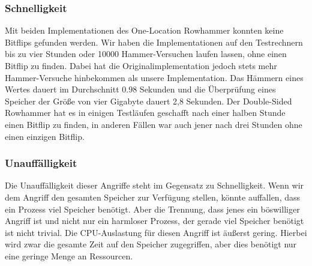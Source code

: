 \subsubsection{Schnelligkeit}
Mit beiden Implementationen des One-Location Rowhammer konnten keine Bitflips gefunden werden. Wir haben die Implementationen auf den Testrechnern bis zu vier Stunden oder 10000 Hammer-Versuchen laufen lassen, ohne einen Bitflip zu finden. Dabei hat die Originalimplementation jedoch stets mehr Hammer-Versuche hinbekommen als unsere Implementation. Das Hämmern eines Wertes dauert im Durchschnitt 0.98 Sekunden und die Überprüfung eines Speicher der Größe von vier Gigabyte dauert 2,8 Sekunden. Der Double-Sided Rowhammer hat es in einigen Testläufen geschafft nach einer halben Stunde einen Bitflip zu finden, in anderen Fällen war auch jener nach drei Stunden ohne einen einzigen Bitflip.
\subsubsection{Unauffälligkeit}
Die Unauffälligkeit dieser Angriffe steht im Gegensatz zu Schnelligkeit. Wenn wir dem Angriff den gesamten Speicher zur Verfügung stellen, könnte auffallen, dass ein Prozess viel Speicher benötigt. Aber die Trennung, dass jenes ein böswilliger Angriff ist und nicht nur ein harmloser Prozess, der gerade viel Speicher benötigt ist nicht trivial. Die CPU-Auslastung für diesen Angriff ist äußerst gering. Hierbei wird zwar die gesamte Zeit auf den Speicher zugegriffen, aber dies benötigt nur eine geringe Menge an Ressourcen.
